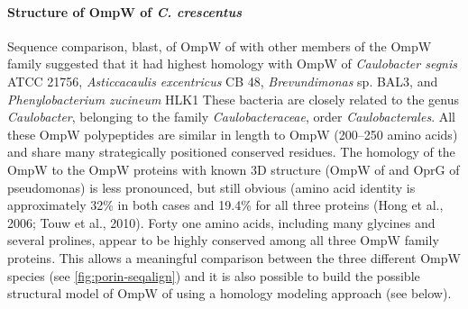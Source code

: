 \paragraph{Structure of OmpW of \textit{C. crescentus}}\label{sub:structompw}
Sequence comparison, \ac{blast}, of OmpW of \caulobacter with other members of
the OmpW family suggested that it had highest homology with OmpW of
\textit{Caulobacter segnis} ATCC 21756, \textit{Asticcacaulis excentricus} CB
48, \textit{Brevundimonas} sp. BAL3, and \textit{Phenylobacterium zucineum}
HLK1 These bacteria are closely related to
the genus \textit{Caulobacter}, belonging to the family
\textit{Caulobacteraceae}, order \textit{Caulobacterales}. All these OmpW
polypeptides are similar in length to \caulobacter OmpW (200--250 amino acids)
and share many strategically positioned conserved residues. The homology of the
\caulobacter OmpW to the OmpW proteins with known 3D structure (OmpW of \ecoli
and OprG of \ac{pseudomonas}) is less pronounced, but still obvious (amino acid
identity is approximately 32\% in both cases and 19.4\% for all three proteins
(Hong et al., 2006; Touw et al., 2010). Forty one amino acids, including many glycines
and several prolines, appear to be highly conserved among all three OmpW
family proteins. This allows a meaningful comparison between the three different
OmpW species (see \cref{fig:porin-seqalign}) and it is also possible to build
the possible structural model of OmpW of \caulobacter using a homology modeling approach (see below). 

